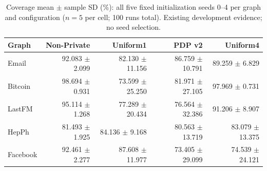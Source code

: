 \begin{table}[htbp]
\centering\small
\caption{Coverage mean $\pm$ sample SD (\%): all five fixed initialization seeds 0--4 per graph and configuration ($n=5$ per cell; 100 runs total). Existing development evidence; no seed selection.}\label{tab:coverage}
\begin{tabular}{lrrrr}
\toprule
Graph & Non-Private & Uniform1 & PDP v2 & Uniform4\\ \midrule
Email & 92.083 $\pm$ 2.099 & 82.130 $\pm$ 11.156 & 86.759 $\pm$ 10.791 & 89.259 $\pm$ 6.829 \\
Bitcoin & 98.694 $\pm$ 0.931 & 73.599 $\pm$ 25.250 & 81.971 $\pm$ 27.105 & 97.969 $\pm$ 0.731 \\
LastFM & 95.114 $\pm$ 1.268 & 77.289 $\pm$ 20.434 & 76.564 $\pm$ 32.386 & 91.206 $\pm$ 8.907 \\
HepPh & 81.493 $\pm$ 1.925 & 84.136 $\pm$ 9.168 & 80.563 $\pm$ 13.719 & 83.079 $\pm$ 13.375 \\
Facebook & 92.461 $\pm$ 2.277 & 87.608 $\pm$ 11.977 & 73.405 $\pm$ 29.099 & 74.539 $\pm$ 24.121 \\
\bottomrule\end{tabular}
\end{table}
